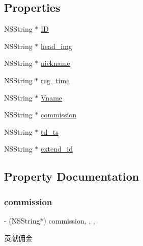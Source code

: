 \subsection*{Properties}
\begin{DoxyCompactItemize}
\item 
N\+S\+String $\ast$ \mbox{\hyperlink{interface_p_t_mfan_a998a888fcb6d50f07c26211272ff485c}{ID}}
\item 
N\+S\+String $\ast$ \mbox{\hyperlink{interface_p_t_mfan_a58e6fa9b4fd4d0ac4796a6dd99b8fa5b}{head\+\_\+img}}
\item 
N\+S\+String $\ast$ \mbox{\hyperlink{interface_p_t_mfan_ab97e8d80585a697863f03153ef2ab160}{nickname}}
\item 
N\+S\+String $\ast$ \mbox{\hyperlink{interface_p_t_mfan_a44cdabad99491c59ac0bc047d823f660}{reg\+\_\+time}}
\item 
N\+S\+String $\ast$ \mbox{\hyperlink{interface_p_t_mfan_a08fb619d87a8e571c673ca0c30a9a94f}{Vname}}
\item 
N\+S\+String $\ast$ \mbox{\hyperlink{interface_p_t_mfan_ada650a6d26c583ce6c2cfebffbd2fa1c}{commission}}
\item 
N\+S\+String $\ast$ \mbox{\hyperlink{interface_p_t_mfan_ab5654478302146e3197db3b4ba481a76}{td\+\_\+ts}}
\item 
N\+S\+String $\ast$ \mbox{\hyperlink{interface_p_t_mfan_a53d4603e6ec063b7cf4589818a0a6b43}{extend\+\_\+id}}
\end{DoxyCompactItemize}


\subsection{Property Documentation}
\mbox{\label{interface_p_t_mfan_ada650a6d26c583ce6c2cfebffbd2fa1c}} 
\subsubsection{\texorpdfstring{commission}{commission}}
{\footnotesize\ttfamily -\/ (N\+S\+String$\ast$) commission\hspace{0.3cm}{\ttfamily [read]}, {\ttfamily [write]}, {\ttfamily [nonatomic]}, {\ttfamily [copy]}}

贡献佣金 \mbox{\label{interface_p_t_mfan_a53d4603e6ec063b7cf4589818a0a6b43}} 
